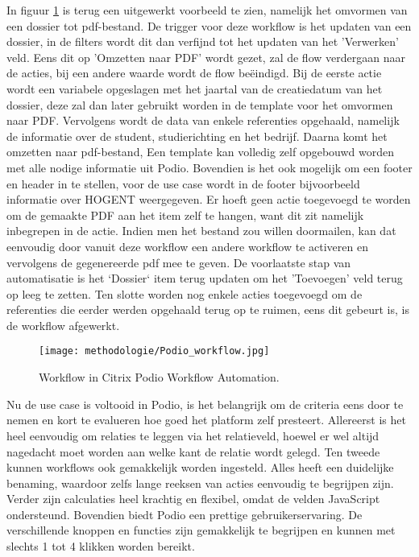 In figuur \ref{fig:meth_podio_workflow} is terug een uitgewerkt voorbeeld te zien, namelijk het omvormen van een dossier tot pdf-bestand. De trigger voor deze workflow is het updaten van een dossier, in de filters wordt dit dan verfijnd tot het updaten van het 'Verwerken' veld. Eens dit op 'Omzetten naar PDF' wordt gezet, zal de flow verdergaan naar de acties, bij een andere waarde wordt de flow beëindigd. Bij de eerste actie wordt een variabele opgeslagen met het jaartal van de creatiedatum van het dossier, deze zal dan later gebruikt worden in de template voor het omvormen naar PDF. Vervolgens wordt de data van enkele referenties opgehaald, namelijk de informatie over de student, studierichting en het bedrijf. Daarna komt het omzetten naar pdf-bestand, Een template kan volledig zelf opgebouwd worden met alle nodige informatie uit Podio. Bovendien is het ook mogelijk om een footer en header in te stellen, voor de use case wordt in de footer bijvoorbeeld informatie over HOGENT weergegeven. Er hoeft geen actie toegevoegd te worden om de gemaakte PDF aan het item zelf te hangen, want dit zit namelijk inbegrepen in de actie. Indien men het bestand zou willen doormailen, kan dat eenvoudig door vanuit deze workflow een andere workflow te activeren en vervolgens de gegenereerde pdf mee te geven. De voorlaatste stap van automatisatie is het `Dossier` item terug updaten om het 'Toevoegen' veld terug op leeg te zetten. Ten slotte worden nog enkele acties toegevoegd om de referenties die eerder werden opgehaald terug op te ruimen, eens dit gebeurt is, is de workflow afgewerkt. \\

\begin{figure}[h]
    \centering
    \texttt{[image: methodologie/Podio\_workflow.jpg]}
    \caption{Workflow in Citrix Podio Workflow Automation.}
    \label{fig:meth_podio_workflow}
\end{figure}

Nu de use case is voltooid in Podio, is het belangrijk om de criteria eens door te nemen en kort te evalueren hoe goed het platform zelf presteert. Allereerst is het heel eenvoudig om relaties te leggen via het relatieveld, hoewel er wel altijd nagedacht moet worden aan welke kant de relatie wordt gelegd. Ten tweede kunnen workflows ook gemakkelijk worden ingesteld. Alles heeft een duidelijke benaming, waardoor zelfs lange reeksen van acties eenvoudig te begrijpen zijn. Verder zijn calculaties heel krachtig en flexibel, omdat de velden JavaScript ondersteund. Bovendien biedt Podio een prettige gebruikerservaring. De verschillende knoppen en functies zijn gemakkelijk te begrijpen en kunnen met slechts 1 tot 4 klikken worden bereikt. \\

